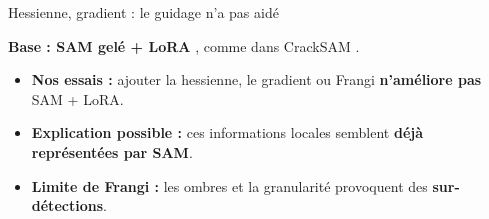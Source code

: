 \begin{frame}[t]{Hessienne, gradient : le guidage n'a pas aidé}
  \begin{center}
    \resizebox{0.48\textwidth}{!}{}\par\smallskip
    {\small \textbf{Base : SAM gelé + LoRA} , comme dans CrackSAM .}
  \end{center}
  \vspace{0.10cm}
  \small
  \begin{itemize}
    \setlength{\itemsep}{7pt}
    \item \textbf{Nos essais :} ajouter la hessienne, le gradient ou Frangi
      \textbf{n'améliore pas} SAM + LoRA.
    \item \textbf{Explication possible :} ces informations locales semblent
      \textbf{déjà représentées par SAM}.
    \item \textbf{Limite de Frangi :} les ombres et la granularité
      provoquent des \textbf{sur-détections}.
  \end{itemize}
  \vspace{0.16cm}
  \begin{center}
  \end{center}
\end{frame}
